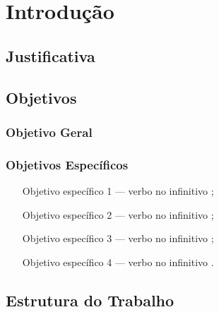 \section{Introdução}
\label{sec:introducao}

\subsection{Justificativa}

\subsection{Objetivos}

\subsubsection{Objetivo Geral}

\subsubsection{Objetivos Específicos}
\begin{itemize}
  \item [Objetivo específico 1 — verbo no infinitivo];
  \item [Objetivo específico 2 — verbo no infinitivo];
  \item [Objetivo específico 3 — verbo no infinitivo];
  \item [Objetivo específico 4 — verbo no infinitivo].
\end{itemize}

\subsection{Estrutura do Trabalho}
